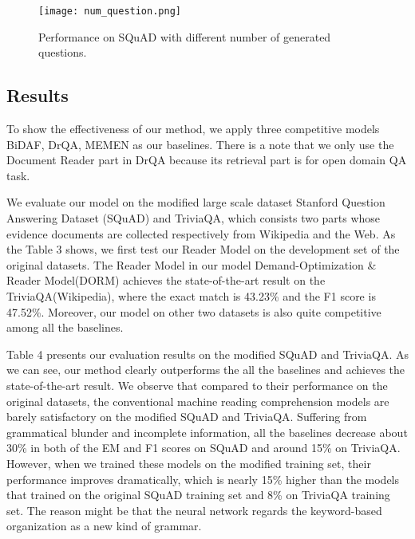 \documentclass[sigconf]{acmart}
\begin{document}
\begin{figure}[t]
  \begin{center}
  \texttt{[image: num\_question.png]}
  \caption{Performance on SQuAD with different number of generated questions.}
  \end{center}
\end{figure}



\subsection{Results}
To show the effectiveness of our method, we apply three competitive models BiDAF\cite{seo2016bidirectional}, DrQA\cite{Chen2017Reading}, MEMEN\cite{pan2017memen} as our baselines. There is a note that we only use the Document Reader part in DrQA because its retrieval part is for open domain QA task. 

We evaluate our model on the modified large scale dataset Stanford Question Answering Dataset (SQuAD) and TriviaQA, which consists two parts whose evidence documents are collected respectively from Wikipedia and the Web. As the Table 3 shows, we first test our Reader Model on the development set of the original datasets. The Reader Model in our model Demand-Optimization \& Reader Model(DORM) achieves the state-of-the-art result on the TriviaQA(Wikipedia), where the exact match is 43.23\%  and the F1 score is 47.52\%. Moreover, our model on other two datasets is also quite competitive among all the baselines. 

Table 4 presents our evaluation results on the modified SQuAD and TriviaQA. As we can see, our method clearly outperforms the all the baselines and achieves the state-of-the-art result. We observe that compared to their performance on the original datasets, the conventional machine reading comprehension models are barely satisfactory on the modified SQuAD and TriviaQA. Suffering from grammatical blunder and incomplete information, all the baselines decrease about 30\% in both of the EM and F1 scores on SQuAD and around 15\% on TriviaQA. However, when we trained these models on the modified training set, their performance improves dramatically, which is nearly 15\% higher than the models that trained on the original SQuAD training set and 8\% on TriviaQA training set. The reason might be that the neural network regards the keyword-based organization as a new kind of grammar. 
\end{document}
